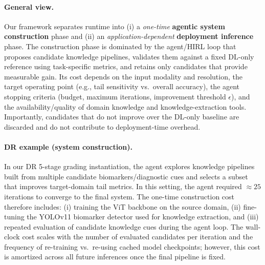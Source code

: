 \documentclass{article}
\begin{document}
\paragraph{General view.}
Our framework separates runtime into (i) a \emph{one-time} \textbf{agentic system construction} phase and (ii) an
\emph{application-dependent} \textbf{deployment inference} phase. The construction phase is dominated by the agent/HIRL
loop that proposes candidate knowledge pipelines, validates them against a fixed DL-only reference using task-specific
metrics, and retains only candidates that provide measurable gain. Its cost depends on the input modality and resolution,
the target operating point (e.g., tail sensitivity vs.\ overall accuracy), the agent stopping criteria (budget, maximum
iterations, improvement threshold $\epsilon$), and the availability/quality of domain knowledge and knowledge-extraction
tools. Importantly, candidates that do not improve over the DL-only baseline are discarded and do not contribute to
deployment-time overhead.

\paragraph{DR example (system construction).}
In our DR 5-stage grading instantiation, the agent explores knowledge pipelines built from multiple candidate
biomarkers/diagnostic cues and selects a subset that improves target-domain tail metrics. In this setting, the agent
required $\approx 25$ iterations to converge to the final system. The one-time construction cost therefore includes:
(i) training the ViT backbone on the source domain, (ii) fine-tuning the YOLOv11 biomarker detector used for knowledge
extraction, and (iii) repeated evaluation of candidate knowledge cues during the agent loop. The wall-clock cost scales
with the number of evaluated candidates per iteration and the frequency of re-training vs.\ re-using cached model
checkpoints; however, this cost is amortized across all future inferences once the final pipeline is fixed.
\end{document}
